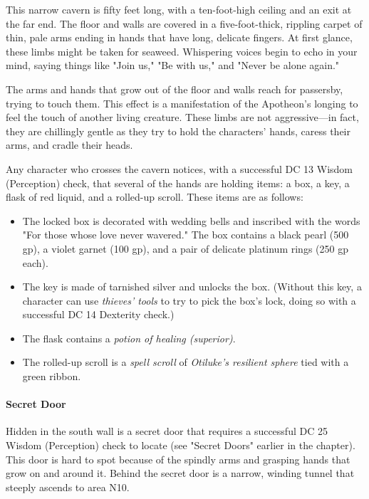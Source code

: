 \documentclass[a4paper, 11pt, bg=full, twocolumn, nooutline]{dndbook}
\begin{document}
\begin{DndReadAloud}
This narrow cavern is fifty feet long, with a ten-foot-high ceiling and an exit at the far end. The floor and walls are covered in a five-foot-thick, rippling carpet of thin, pale arms ending in hands that have long, delicate fingers. At first glance, these limbs might be taken for seaweed. Whispering voices begin to echo in your mind, saying things like "Join us," "Be with us," and "Never be alone again."
\end{DndReadAloud}

The arms and hands that grow out of the floor and walls reach for passersby, trying to touch them. This effect is a manifestation of the Apotheon's longing to feel the touch of another living creature. These limbs are not aggressive---in fact, they are chillingly gentle as they try to hold the characters' hands, caress their arms, and cradle their heads.

Any character who crosses the cavern notices, with a successful DC 13 Wisdom (Perception) check, that several of the hands are holding items: a box, a key, a flask of red liquid, and a rolled-up scroll. These items are as follows:

\begin{itemize}
\item The locked box is decorated with wedding bells and inscribed with the words "For those whose love never wavered." The box contains a black pearl (500 gp), a violet garnet (100 gp), and a pair of delicate platinum rings (250 gp each).
\item The key is made of tarnished silver and unlocks the box. (Without this key, a character can use \textit{thieves' tools} to try to pick the box's lock, doing so with a successful DC 14 Dexterity check.)
\item The flask contains a \textit{potion of healing (superior)}.
\item The rolled-up scroll is a \textit{spell scroll} of \textit{Otiluke's resilient sphere} tied with a green ribbon.
\end{itemize}

\paragraph{Secret Door}

Hidden in the south wall is a secret door that requires a successful DC 25 Wisdom (Perception) check to locate (see "Secret Doors" earlier in the chapter). This door is hard to spot because of the spindly arms and grasping hands that grow on and around it. Behind the secret door is a narrow, winding tunnel that steeply ascends to area N10.
\end{document}
